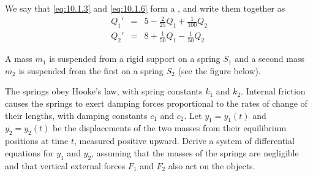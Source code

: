 \documentclass{ximera}
\begin{document}
\begin{example}
\begin{explanation}
We say that \eqref{eq:10.1.3} and \eqref{eq:10.1.6}  form a , and write them together as
\begin{eqnarray*}
Q_1'&=&5-\frac{2}{25}Q_1+\frac{1}{100}Q_2\\
Q_2'&=&8+\frac{1}{50}Q_1-\frac{1}{50}Q_2
\end{eqnarray*}

\end{explanation}
\end{example}


\begin{example}\label{example:10.1.2}
A mass $m_1$ is suspended from a rigid support on a spring $S_1$ and a
second mass $m_2$ is suspended from the first on a spring $S_2$
(see the figure below). 

\begin{center}
\end{center}


The springs obey Hooke's law, with spring
constants $k_1$ and $k_2$. Internal friction causes the springs to
exert damping forces proportional to the rates of change of their
lengths, with damping constants $c_1$ and $c_2$. Let $y_1=y_1(t)$ and
$y_2=y_2(t)$ be the displacements of the two masses from their
equilibrium positions at time $t$, measured positive upward.
 Derive a system of differential equations
for $y_1$ and $y_2$, assuming that the masses of the springs are
negligible and that vertical external forces $F_1$ and $F_2$ also act
on the objects.



\end{example}
\end{document}
